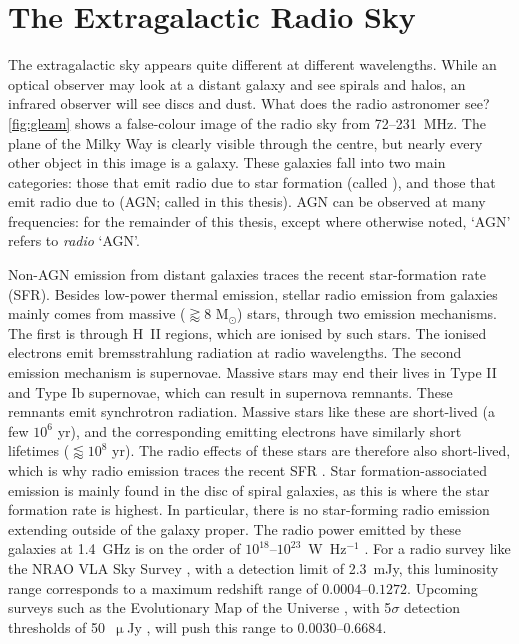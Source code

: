 \section{The Extragalactic Radio Sky}
\label{sec:extragalactic-radio-sky}

    The extragalactic sky appears quite different at different wavelengths. While an optical observer may look at a distant galaxy and see spirals and halos, an infrared observer will see discs and dust. What does the radio astronomer see? 
    \autoref{fig:gleam} shows a false-colour image of the radio sky from 72--231~MHz. The plane of the Milky Way is clearly visible through the centre, but nearly every other object in this image is a galaxy. These galaxies fall into two main categories: those that emit radio due to star formation (called ), and those that emit radio due to  (AGN; called  in this thesis). AGN can be observed at many frequencies: for the remainder of this thesis, except where otherwise noted, `AGN' refers to \emph{radio} `AGN'.

    Non-AGN emission from distant galaxies traces the recent star-formation rate (SFR). Besides low-power thermal emission, stellar radio emission from galaxies mainly comes from massive ($\gtrapprox 8$ M$_\odot$) stars, through two emission mechanisms. The first is through H~II regions, which are ionised by such stars. The ionised electrons emit bremsstrahlung radiation at radio wavelengths. The second emission mechanism is supernovae. Massive stars may end their lives in Type II and Type Ib supernovae, which can result in supernova remnants. These remnants emit synchrotron radiation. Massive stars like these are short-lived (a few $10^6$ yr), and the corresponding emitting electrons have similarly short lifetimes ($\lessapprox 10^8$ yr). The radio effects of these stars are therefore also short-lived, which is why radio emission traces the recent SFR \citep{condon92radio}. Star formation-associated emission is mainly found in the disc of spiral galaxies, as this is where the star formation rate is highest. In particular, there is no star-forming radio emission extending outside of the galaxy proper. The radio power emitted by these galaxies at 1.4~GHz is on the order of $10^{18}$--$10^{23}$~W~Hz$^{-1}$ \citep{condon92radio}. For a radio survey like the NRAO VLA Sky Survey \citep[NVSS;][]{condon98nvss}, with a detection limit of 2.3~mJy, this luminosity range corresponds to a maximum redshift range of $0.0004$--$0.1272$. Upcoming surveys such as the Evolutionary Map of the Universe \citep[EMU;][]{norris11}, with 5$\sigma$ detection thresholds of 50~$\upmu${}Jy \citep{norris_emu_2011}, will push this range to $0.0030$--$0.6684$.

